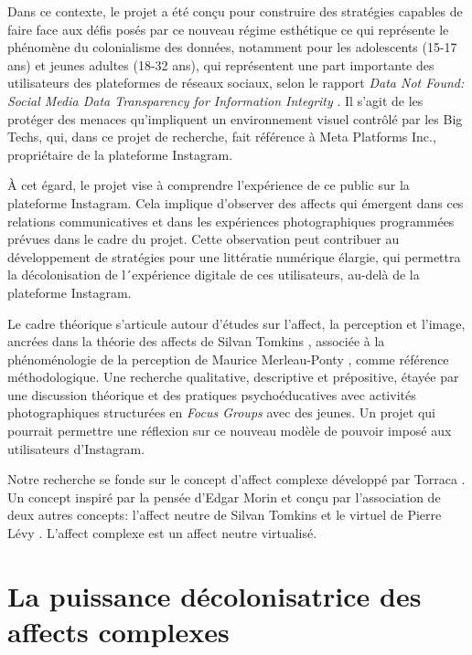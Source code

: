 \documentclass[final,fra]{anthology-ch}         %
\begin{document}
Dans ce contexte, le projet a été conçu pour construire des stratégies capables de faire face aux défis posés par ce nouveau régime esthétique ce qui représente le phénomène du colonialisme des données, notamment pour les adolescents (15-17 ans) et jeunes adultes (18-32 ans), qui représentent une part importante des utilisateurs des plateformes de réseaux sociaux, selon le rapport \textit{Data Not Found: Social Media Data Transparency for Information Integrity} \cite{santini_data_2026}. Il s'agit de les protéger des menaces qu'impliquent un environnement visuel contrôlé par les Big Techs, qui, dans ce projet de recherche, fait référence à Meta Platforms Inc., propriétaire de la plateforme Instagram.

À cet égard, le projet vise à comprendre l'expérience de ce public sur la plateforme Instagram. Cela implique d'observer des affects qui émergent dans ces relations communicatives et dans les expériences photographiques programmées prévues dans le cadre du projet. Cette observation peut contribuer au développement de stratégies pour une littératie numérique élargie, qui permettra la décolonisation de l´expérience digitale de ces utilisateurs, au-delà de la plateforme Instagram.

Le cadre théorique s'articule autour d'études sur l'affect, la perception et l'image, ancrées dans la théorie des affects de Silvan Tomkins \cite{tomkins1962affect,tomkins1963affect}, associée à la phénoménologie de la perception de Maurice Merleau-Ponty \cite{merleauponty2018fenomenologia}, comme référence méthodologique. Une recherche qualitative, descriptive et prépositive, étayée par une discussion théorique et des pratiques psychoéducatives avec activités photographiques structurées en \textit{Focus Groups} \cite{abreu2009grupos} avec des jeunes. Un projet qui pourrait permettre une réflexion sur ce nouveau modèle de pouvoir imposé aux utilisateurs d'Instagram.

Notre recherche se fonde sur le concept d'affect complexe développé par Torraca \cite{torraca2019espetaculo}. Un concept inspiré par la pensée d'Edgar Morin \cite{morin2015introducao} et conçu par l'association de deux autres concepts: l'affect neutre de Silvan Tomkins \cite{tomkins1962affect,tomkins1963affect} et le virtuel de Pierre Lévy \cite{levy2007virtual}. L'affect complexe est un affect neutre virtualisé.

\section{La puissance décolonisatrice des affects complexes}
\end{document}
